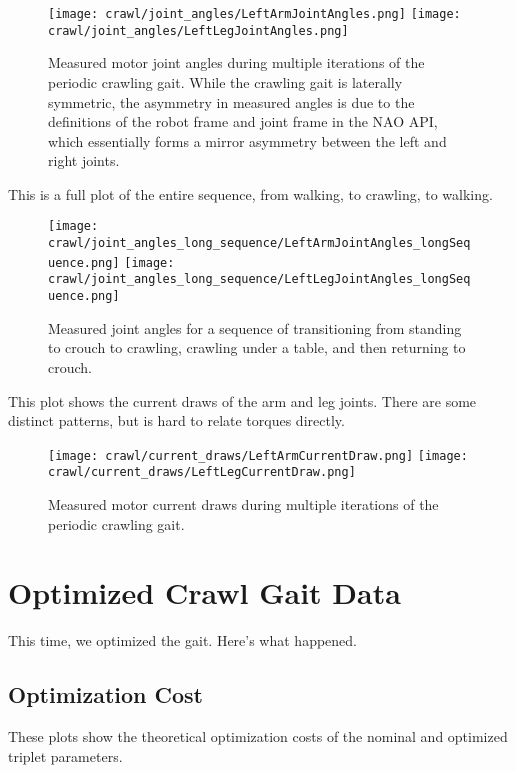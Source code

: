 \begin{figure}
  \centerline{
    \texttt{[image: crawl/joint\_angles/LeftArmJointAngles.png]}
    \texttt{[image: crawl/joint\_angles/LeftLegJointAngles.png]}
  }
  \caption{Measured motor joint angles during multiple iterations of the periodic crawling gait.
           While the crawling gait is laterally symmetric, the asymmetry in measured angles is due to the
           definitions of the robot frame and joint frame in the NAO API, which essentially forms a mirror
           asymmetry between the left and right joints.}
  \label{fig:nao_joint_angles1}
\end{figure}

This is a full plot of the entire sequence, from walking, to crawling, to walking.

\begin{figure}
  \centerline{
    \texttt{[image: crawl/joint\_angles\_long\_sequence/LeftArmJointAngles\_longSequence.png]}
    \texttt{[image: crawl/joint\_angles\_long\_sequence/LeftLegJointAngles\_longSequence.png]}
  }
  \caption{Measured joint angles for a sequence of transitioning from standing to crouch to crawling,
           crawling under a table, and then returning to crouch.}
  \label{fig:nao_joint_angles_long_seq}
\end{figure}

This plot shows the current draws of the arm and leg joints.
There are some distinct patterns, but is hard to relate torques directly.

\begin{figure}
  \centerline{
    \texttt{[image: crawl/current\_draws/LeftArmCurrentDraw.png]}
    \texttt{[image: crawl/current\_draws/LeftLegCurrentDraw.png]}
  }
  \caption{Measured motor current draws during multiple iterations of the periodic crawling gait.}
  \label{fig:nao_currents}
\end{figure}




\FloatBarrier
\section{Optimized Crawl Gait Data} \label{sec:opt_crawl_data}

This time, we optimized the gait. Here's what happened.

\subsection{Optimization Cost}
These plots show the theoretical optimization costs of the nominal and optimized
triplet parameters. 



